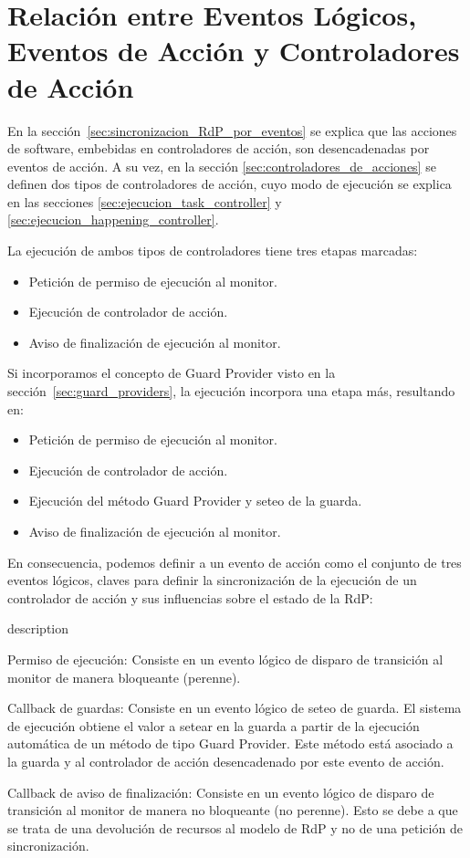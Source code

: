 \section{Relación entre Eventos Lógicos, Eventos de Acción y Controladores de
Acción}
\label{sec:relacion_evento_controlador}
En la sección~\ref{sec:sincronizacion_RdP_por_eventos} se explica que las
acciones de software, embebidas en controladores de acción, son desencadenadas
por eventos de acción. A su vez, en la sección
\ref{sec:controladores_de_acciones} se definen dos tipos de controladores de
acción, cuyo modo de ejecución se explica en las secciones
\ref{sec:ejecucion_task_controller} y \ref{sec:ejecucion_happening_controller}.

La ejecución de ambos tipos de controladores tiene tres etapas marcadas:
\begin{itemize}
  \item Petición de permiso de ejecución al monitor.
  \item Ejecución de controlador de acción.
  \item Aviso de finalización de ejecución al monitor.
\end{itemize}

Si incorporamos el concepto de Guard Provider visto en la
sección~\ref{sec:guard_providers}, la ejecución incorpora una etapa más,
resultando en:
\begin{itemize}
  \item Petición de permiso de ejecución al monitor.
  \item Ejecución de controlador de acción.
  \item Ejecución del método Guard Provider y seteo de la guarda.
  \item Aviso de finalización de ejecución al monitor.
\end{itemize}

En consecuencia, podemos definir a un evento de acción como el conjunto de tres
eventos lógicos, claves para definir la sincronización de la ejecución de un
controlador de acción y sus influencias sobre el estado de la RdP:
\begin{labeling}{description}
  \item [Permiso de ejecución: ] Consiste en un evento lógico de disparo
  de transición al monitor de manera bloqueante (perenne).
  \item [Callback de guardas: ] Consiste en un evento lógico de seteo de
  guarda. El sistema de ejecución obtiene el valor a setear en la guarda a
  partir de la ejecución automática de un método de tipo Guard Provider. Este
  método está asociado a la guarda y al controlador de acción desencadenado por
  este evento de acción.
  \item [Callback de aviso de finalización: ]
  Consiste en un evento lógico de disparo de transición al monitor de manera no
  bloqueante (no perenne). Esto se debe a que se trata de una devolución de
  recursos al modelo de RdP y no de una petición de sincronización.
\end{labeling}

